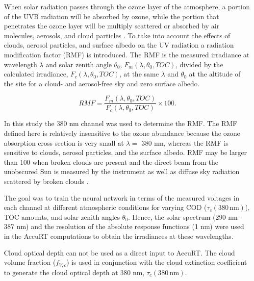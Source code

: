 \documentclass{optica-article}
\begin{document}
When solar radiation passes through the ozone layer of the atmosphere, a portion of the UVB radiation will be absorbed by ozone, while the portion that penetrates the ozone layer will be multiply scattered or absorbed by air molecules, aerosols, and cloud particles 
\cite{knutbook}. 
To take into account the effects of clouds, aerosol particles, and surface albedo on the UV radiation a radiation modification factor (RMF) is introduced. The RMF is the measured irradiance at wavelength $\lambda$ and solar zenith angle $\theta_0$, $F_m(\lambda,\theta_0,TOC)$, divided by the calculated irradiance, $F_c(\lambda,\theta_0,{ TOC})$, at the same $\lambda$ and $\theta_0$ at the altitude of the site for a cloud- and aerosol-free sky and zero surface albedo.

\begin{equation}
	\label{eq:CLT}
 		RMF =\frac{F_m(\lambda,\theta_0,{ TOC})}{F_c(\lambda,\theta_0,{ TOC})}\times 100.
\end{equation}

In this study the 380 nm channel was used to determine the RMF. 
The RMF defined here is  relatively insensitive to 
the ozone abundance because the ozone absorption cross section is very small at $\lambda=$ 380 nm, whereas the RMF is sensitive to clouds, aerosol particles, and the surface albedo. 
RMF may be larger than 100 when broken clouds are present and the direct beam from the unobscured Sun is measured by the instrument as well as diffuse sky radiation scattered by broken clouds \cite{Dahlback:2003}. 

The goal was to train the neural network in terms of the measured voltages in each channel at different atmospheric conditions for varying COD ($\tau_c{\scriptstyle(380 \, \text{nm})}$), TOC amounts, and solar zenith angles $\theta_0$. Hence,  the solar spectrum (290 nm - 387 nm) and the resolution of the absolute response functions (1 nm) were used in the AccuRT computations to obtain the irradiances at these wavelengths.

Cloud optical depth can not be used as a direct input to AccuRT. 
The cloud volume fraction ($f_{V,c}$) is used in conjunction with the cloud extinction coefficient to generate the cloud optical depth at 380 nm, $\tau_c{\scriptstyle(380 \, \text{nm})}$. 
\end{document}
